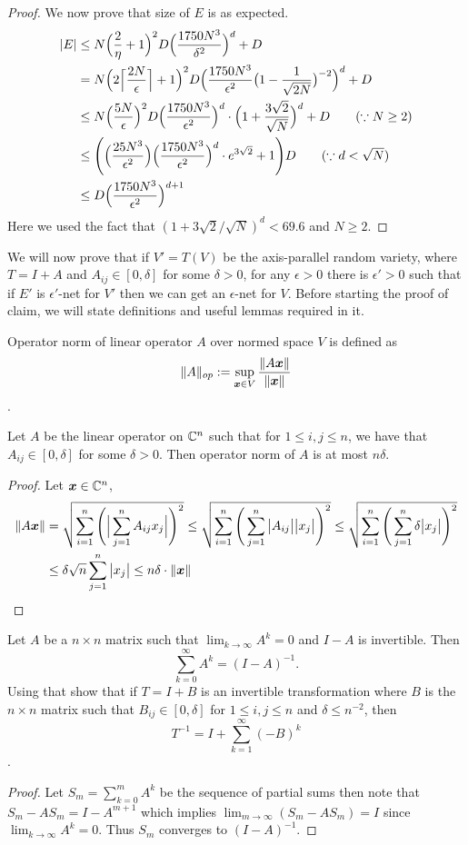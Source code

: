 {\begin{proof}
We now prove that size of $E$ is as expected.
\begin{align*}
|E|&\le N\Big(\frac{2}{\eta}+1\Big)^2D\Big(\frac{1750N^3}{\delta^2}\Big)^{d} + D \\
&= N\Big(2\Big\lceil\frac{2N}{\epsilon}\Big\rceil+1\Big)^2D\Big(\frac{1750N^3}{\epsilon^2}\big(1-\frac{1}{\sqrt{2N}}\big)^{-2}\Big)^{d} + D\\
&\le N\Big(\frac{5N}{\epsilon}\Big)^2D\Big(\frac{1750N^3}{\epsilon^2}\Big)^d\cdot\Big(1+\frac{3\sqrt{2}}{\sqrt{N}}\Big)^d+D\tag{$\because N\ge2$}\\
&\le \Bigg(\Big(\frac{25N^3}{\epsilon^2}\Big)\Big(\frac{1750N^3}{\epsilon^2}\Big)^d\cdot e^{3\sqrt{2}}+1\Bigg)D\tag{$\because d<\sqrt{N}$}\\
&\le D\Big(\frac{1750N^3}{\epsilon^2}\Big)^{d+1}
\end{align*} 
Here we used the fact that $(1+3\sqrt{2}/\sqrt N)^d<69.6$ and $N \ge 2$.
\end{proof}
We will now prove that if $V'=T(V)$ be the axis-parallel random variety, where $T=I+A$ and $A_{ij} \in [0,\delta]$ for some $\delta>0$, for any $\epsilon>0$ there is $\epsilon'>0$ such that if $E'$ is $\epsilon'$-net for $V'$ then we can get an $\epsilon$-net for $V$. Before starting the proof of claim, we will state definitions and useful lemmas required in it.
\begin{definition}
Operator norm of linear operator $A$ over normed space $V$ is defined as 
$$
\|A\|_{op}:=\sup_{\bm x\in V} \frac{\|A\bm x\|}{\|\bm x\|}
$$.
\end{definition}
\begin{lemma}
Let $A$ be the linear operator on $\mathbb{C}^n$ such that for $1\le i,j \le n$, we have that $A_{ij} \in [0,\delta]$ for some $\delta>0$. Then operator norm of $A$ is at most $n\delta$.
\end{lemma}
\begin{proof}
Let $\bm x\in \mathbb{C}^n$,
\begin{align*}
\|A\bm x\| &= \sqrt{\sum_{i=1}^{n}\Bigg(\Big|\sum_{j=1}^{n}A_{ij}x_j\Big|\Bigg)^2} \le \sqrt{\sum_{i=1}^{n}\Bigg(\sum_{j=1}^{n}\big|A_{ij}\big|\big|x_j\big|\Bigg)^2} \le \sqrt{\sum_{i=1}^{n}\Bigg(\sum_{j=1}^{n}\delta \big|x_j\big|\Bigg)^2}\\
&\le \delta\sqrt{n}\sum_{j=1}^{n}\big|x_j\big| \le n\delta\cdot\|\bm x\|
\end{align*}
\end{proof}
\begin{lemma}
Let $A$ be a $n\times n$ matrix such that $\lim_{k \to \infty}A^k = 0$ and $I-A$ is invertible. Then 
$$\sum_{k=0}^\infty A^k = (I-A)^{-1}.$$ 
Using that show that if $T=I+B$ is an invertible transformation where $B$ is the $n\times n$ matrix such that $B_{ij} \in [0,\delta]$ for $1\le i,j \le n$ and $\delta \le n^{-2}$, then 
$$
T^{-1} = I+\sum_{k=1}^{\infty} (-B)^k
$$.
\end{lemma}
\begin{proof}
Let $S_m = \sum_{k=0}^{m} A^k$ be the sequence of partial sums then note that $S_m-AS_m = I-A^{m+1}$ which implies $\lim_{m\to \infty}(S_m-AS_m)=I$ since $\lim_{k \to \infty}A^k=0$. Thus $S_m$ converges to $(I-A)^{-1}$.
\npara


\end{proof}}
